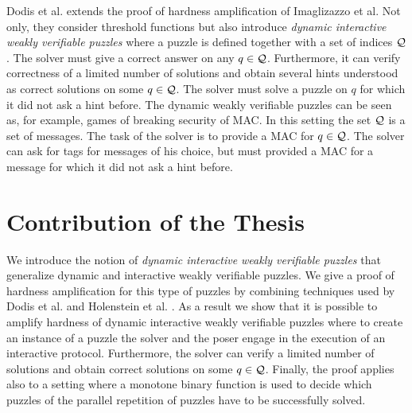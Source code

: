 Dodis et al. \cite{dodis2009security} extends the proof of hardness amplification of Imaglizazzo et al.
Not only, they consider threshold functions but also introduce \textit{dynamic interactive weakly verifiable puzzles} where a puzzle is defined together with a set of indices $\mathcal{Q}$.
The solver must give a correct answer on any $q \in \mathcal{Q}$. Furthermore, it can verify correctness of a limited number of solutions and
obtain several hints understood as correct solutions on some $q \in \mathcal{Q}$. The solver must solve a puzzle on $q$ for which it did not ask a hint before.
The dynamic weakly verifiable puzzles can be seen as, for example, games of breaking security of MAC.
In this setting the set $\mathcal{Q}$ is a set of messages. The task of the solver is to provide a MAC for $q \in \mathcal{Q}$.
The solver can ask for tags for messages of his choice, but must provided a MAC for a message for which it did not ask a hint before.



\section{Contribution of the Thesis}
We introduce the notion of \textit{dynamic interactive weakly verifiable puzzles} that generalize dynamic and interactive
weakly verifiable puzzles.
We give a proof of hardness amplification for this type of puzzles by combining techniques
used by Dodis et al. \cite{dodis2009security} and Holenstein et al. \cite{holenstein2011general}.
As a result we show that it is possible to amplify hardness of dynamic interactive weakly verifiable puzzles where
to create an instance of a puzzle the solver and the poser engage in the execution of an interactive protocol.
Furthermore, the solver can verify a limited number of solutions and obtain correct solutions on some $q \in \mathcal{Q}$.
Finally, the proof applies also to a setting where a monotone binary function is used to decide which puzzles of the parallel repetition of puzzles
have to be successfully solved.
%
